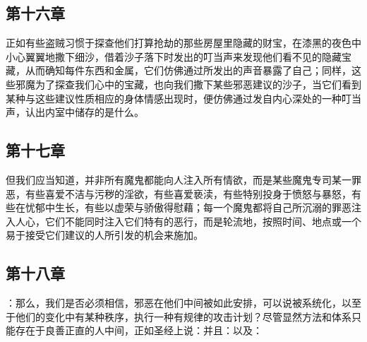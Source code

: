 
\subsection{第十六章}

\par

正如有些盗贼习惯于探查他们打算抢劫的那些房屋里隐藏的财宝，在漆黑的夜色中小心翼翼地撒下细沙，借着沙子落下时发出的叮当声来发现他们看不见的隐藏宝藏，从而确知每件东西和金属，它们仿佛通过所发出的声音暴露了自己；同样，这些邪魔为了探查我们心中的宝藏，也向我们撒下某些邪恶建议的沙子，当它们看到某种与这些建议性质相应的身体情感出现时，便仿佛通过发自内心深处的一种叮当声，认出内室中储存的是什么。\par


\subsection{第十七章}

\par

但我们应当知道，并非所有魔鬼都能向人注入所有情欲，而是某些魔鬼专司某一罪恶，有些喜爱不洁与污秽的淫欲，有些喜爱亵渎，有些特别投身于愤怒与暴怒，有些在忧郁中生长，有些以虚荣与骄傲得慰藉；每一个魔鬼都将自己所沉溺的罪恶注入人心，它们不能同时注入它们特有的恶行，而是轮流地，按照时间、地点或一个易于接受它们建议的人所引发的机会来施加。\par


\subsection{第十八章}

\par

：那么，我们是否必须相信，邪恶在他们中间被如此安排，可以说被系统化，以至于他们的变化中有某种秩序，执行一种有规律的攻击计划？尽管显然方法和体系只能存在于良善正直的人中间，正如圣经上说：并且：以及：\par

